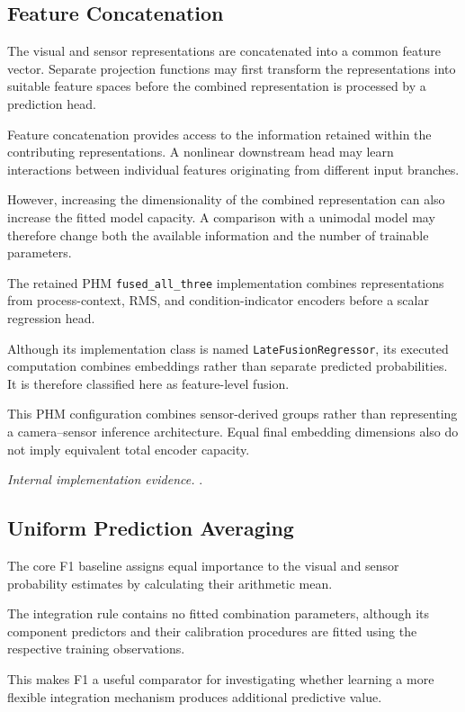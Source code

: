 \subsection{Feature Concatenation}

The visual and sensor representations are concatenated into a common feature vector. Separate projection functions may first transform the representations into suitable feature spaces before the combined representation is processed by a prediction head.

Feature concatenation provides access to the information retained within the contributing representations. A nonlinear downstream head may learn interactions between individual features originating from different input branches.

However, increasing the dimensionality of the combined representation can also increase the fitted model capacity. A comparison with a unimodal model may therefore change both the available information and the number of trainable parameters.

The retained PHM \texttt{fused\_all\_three} implementation combines representations from process-context, RMS, and condition-indicator encoders before a scalar regression head.

Although its implementation class is named \texttt{LateFusionRegressor}, its executed computation combines embeddings rather than separate predicted probabilities. It is therefore classified here as feature-level fusion.

This PHM configuration combines sensor-derived groups rather than representing a camera–sensor inference architecture. Equal final embedding dimensions also do not imply equivalent total encoder capacity.

\noindent\textit{Internal implementation evidence.} .

\subsection{Uniform Prediction Averaging}

The core F1 baseline assigns equal importance to the visual and sensor probability estimates by calculating their arithmetic mean.

The integration rule contains no fitted combination parameters, although its component predictors and their calibration procedures are fitted using the respective training observations.

This makes F1 a useful comparator for investigating whether learning a more flexible integration mechanism produces additional predictive value.

